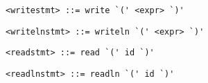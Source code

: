 \begin{footnotesize}
\begin{lstlisting}[frame=single, label={writestmt}, language=pie]
<writestmt> ::= write `(' <expr> `)'
\end{lstlisting}

\begin{lstlisting}[frame=single, label={writelnstmt}, language=pie]
<writelnstmt> ::= writeln `(' <expr> `)'
\end{lstlisting}

\begin{lstlisting}[frame=single, label={readstmt}, language=pie]
<readstmt> ::= read `(' id `)'
\end{lstlisting}

\begin{lstlisting}[frame=single, label={readlnstmt}, language=pie]
<readlnstmt> ::= readln `(' id `)'
\end{lstlisting}
\end{footnotesize}